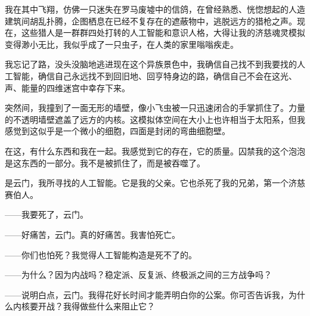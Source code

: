 \documentclass[AutoFakeBold=true]{book}
\begin{document}
我在其中飞翔，仿佛一只迷失在罗马废墟中的信鸽，在曾经熟悉、恍惚想起的人造建筑间胡乱扑腾，企图栖息在已经不复存在的遮蔽物中，逃脱远方的猎枪之声。现在，这些猎人是一群群四处打转的人工智能和意识人格，大得让我的济慈魂灵模拟变得渺小无比，我似乎成了一只虫子，在人类的家里嗡嗡疾走。

我忘记了路，没头没脑地逃进现在这个异族景色中，我确信自己找不到我要找的人工智能，确信自己永远找不到回旧地、回亨特身边的路，确信自己不会在这光、声、能量的四维迷宫中幸存下来。

突然间，我撞到了一面无形的墙壁，像小飞虫被一只迅速闭合的手掌抓住了。力量的不透明墙壁遮盖了远方的内核。这模拟体空间在大小上也许相当于太阳系，但我感觉到这似乎是一个微小的细胞，四面是封闭的弯曲细胞壁。

在这，有什么东西和我在一起。我感觉到它的存在，它的质量。囚禁我的这个泡泡是这东西的一部分。我不是被抓住了，而是被吞噬了。

{\heiti [嚇！]}

{\heiti [我知道你总有一天会回家的]}

是云门，我所寻找的人工智能。它是我的父亲。它也杀死了我的兄弟，第一个济慈赛伯人。

{\kaishu ——我要死了，云门。}

{}

{\kaishu ——好痛苦，云门。真的好痛苦。我害怕死亡。}

{\heiti [我们也一样/济慈]}

{\kaishu ——你们也怕死？我觉得人工智能构造是死不了的。}

{}

{\kaishu ——为什么？因为内战吗？稳定派、反复派、终极派之间的三方战争吗？}

{}

{\kaishu ——说明白点，云门。我得花好长时间才能弄明白你的公案。你可否告诉我，为什么内核要开战？我得做些什么来阻止它？}
\end{document}
